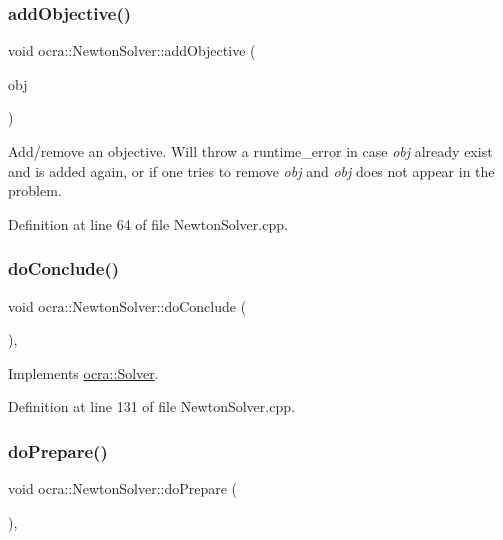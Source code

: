 \subsubsection{\texorpdfstring{add\+Objective()}{addObjective()}}
{\footnotesize\ttfamily void ocra\+::\+Newton\+Solver\+::add\+Objective (\begin{DoxyParamCaption}\item[{\hyperlink{namespaceocra_a37a91885f4fa5c523d22cb15d5673062}{Generic\+Objective} \&}]{obj }\end{DoxyParamCaption})}

Add/remove an objective. Will throw a runtime\+\_\+error in case {\itshape obj} already exist and is added again, or if one tries to remove {\itshape obj} and {\itshape obj} does not appear in the problem. 

Definition at line 64 of file Newton\+Solver.\+cpp.

\hypertarget{classocra_1_1NewtonSolver_ae356c90b0931d0cf3571039e52647ef4}{}\label{classocra_1_1NewtonSolver_ae356c90b0931d0cf3571039e52647ef4} 
\subsubsection{\texorpdfstring{do\+Conclude()}{doConclude()}}
{\footnotesize\ttfamily void ocra\+::\+Newton\+Solver\+::do\+Conclude (\begin{DoxyParamCaption}{ }\end{DoxyParamCaption})\hspace{0.3cm}{\ttfamily [protected]}, {\ttfamily [virtual]}}



Implements \hyperlink{classocra_1_1Solver_ac9d2d41d544b57a75e0d03db073d646e}{ocra\+::\+Solver}.



Definition at line 131 of file Newton\+Solver.\+cpp.

\hypertarget{classocra_1_1NewtonSolver_af717009e42a86f10a793f172883cc93d}{}\label{classocra_1_1NewtonSolver_af717009e42a86f10a793f172883cc93d} 
\subsubsection{\texorpdfstring{do\+Prepare()}{doPrepare()}}
{\footnotesize\ttfamily void ocra\+::\+Newton\+Solver\+::do\+Prepare (\begin{DoxyParamCaption}\item[{void}]{ }\end{DoxyParamCaption})\hspace{0.3cm}{\ttfamily [protected]}, {\ttfamily [virtual]}}



